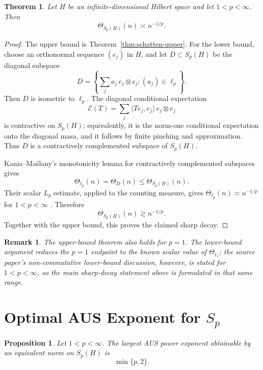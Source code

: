 \documentclass[11pt]{article}
\newtheorem{theorem}{Theorem}
\newtheorem{proposition}{Proposition}
\newtheorem{remark}{Remark}
\begin{document}
\begin{theorem}\label{thm:schatten-sharp}
Let \(H\) be an infinite-dimensional Hilbert space and let
\(1<p<\infty\).  Then
\[
  \Theta_{S_p(H)}(n)\asymp n^{-1/p}.
\]
\end{theorem}

\begin{proof}
The upper bound is Theorem~\ref{thm:schatten-upper}.  For the lower bound,
choose an orthonormal sequence \((e_j)\) in \(H\), and let \(D\subset S_p(H)\)
be the diagonal subspace
\[
  D=\left\{\sum_j a_j\, e_j\otimes e_j: (a_j)\in\ell_p\right\}.
\]
Then \(D\) is isometric to \(\ell_p\).  The diagonal conditional expectation
\[
  \mathcal E(T)=\sum_j \langle Te_j,e_j\rangle\, e_j\otimes e_j
\]
is contractive on \(S_p(H)\); equivalently, it is the norm-one conditional
expectation onto the diagonal masa, and it follows by finite pinching and
approximation.  Thus \(D\) is a contractively complemented subspace of
\(S_p(H)\).

Kania--Ma\'slany's monotonicity lemma for contractively complemented subspaces
\cite[Lemma 3.3]{KM2512} gives
\[
  \Theta_{\ell_p}(n)=\Theta_D(n)\le \Theta_{S_p(H)}(n).
\]
Their scalar \(L_p\) estimate, applied to the counting measure, gives
\(\Theta_{\ell_p}(n)\asymp n^{-1/p}\) for \(1<p<\infty\)
\cite[Corollary 3.4 and the preceding remark]{KM2512}.  Therefore
\[
  \Theta_{S_p(H)}(n)\gtrsim n^{-1/p}.
\]
Together with the upper bound, this proves the claimed sharp decay.
\end{proof}

\begin{remark}
The upper-bound theorem also holds for \(p=1\).  The lower-bound argument
reduces the \(p=1\) endpoint to the known scalar value of \(\Theta_{\ell_1}\);
the source paper's non-commutative lower-bound discussion, however, is stated
for \(1<p<\infty\), so the main sharp-decay statement above is formulated in
that same range.
\end{remark}

\section*{Optimal AUS Exponent for \(S_p\)}

\begin{proposition}\label{prop:aus-exponent}
Let \(1<p<\infty\).  The largest AUS power exponent obtainable by an
equivalent norm on \(S_p(H)\) is
\[
  \min\{p,2\}.
\]
\end{proposition}
\end{document}
